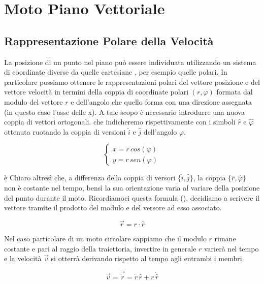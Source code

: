 \chapter{Moto Piano Vettoriale}

\section{Rappresentazione Polare della Velocità}

La posizione di un punto nel piano può essere individuata utilizzando un sistema di coordinate diverse da quelle cartesiane
, per esempio quelle polari.
In particolare possiamo ottenere le rappresentazioni polari del vettore posizione e del vettore velocità in
termini della coppia di coordinate polari $(r, \varphi)$ formata dal modulo del vettore $r$ e dell'angolo
che quello forma con una direzione assegnata (in questo caso l'asse delle x).
A tale scopo è necessario introdurre una nuova coppia di vettori ortogonali. che indicheremo rispettivamente
con i simboli $\hat{r}$ e $\hat{\varphi}$ ottenuta ruotando la coppia di versioni $\hat{i}$ e $\hat{j}$
dell'angolo $\varphi$.


\begin{equation}
  \begin{cases}
    x = r \, cos(\varphi) \\
    y = r \, sen(\varphi)
  \end{cases}
\end{equation}

è Chiaro altresì che, a differenza della coppia di versori
$\lbrace \hat{i}, \hat{j} \rbrace$, la coppia
$\lbrace \hat{r}, \hat{\varphi} \rbrace$ non è costante nel
tempo, bensì la sua orientazione varia al variare della posizione
del punto durante il moto.
Ricordiamoci questa formula (), decidiamo a scrivere il vettore tramite
il prodotto del modulo e del versore ad esso associato.

\begin{equation}
  \vec{r} = r \cdot \hat{r}
\end{equation}


Nel caso particolare di un moto circolare sappiamo che il modulo
$r$ rimane costante e pari al raggio della traiettoria,
invertire in generale $r$ varierà nel tempo e la velocità
$\vec{v}$ si otterrà derivando rispetto al tempo agli entrambi i membri


\begin{equation}
  \vec{v} = \vec{\dot{r}} = \dot{r} \, \hat{r} + r \, \dot{\hat{r}}
\end{equation}

